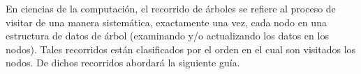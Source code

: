En ciencias de la computación, el recorrido de árboles se refiere al proceso de visitar de una manera sistemática, exactamente una vez, cada nodo en una estructura de datos de árbol (examinando y/o actualizando los datos en los nodos). Tales recorridos están clasificados por el orden en el cual son visitados los nodos. De dichos recorridos abordará la siguiente guía.